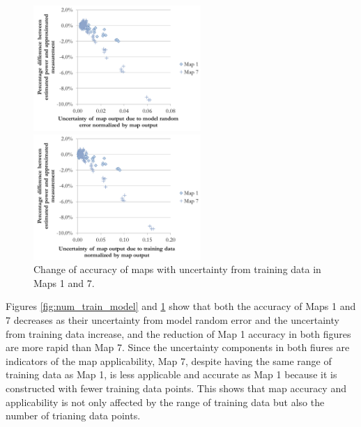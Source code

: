 \begin{figure}[h]
\begin{minipage}{15pc}
\includegraphics[width=15pc]{num_train_model.pdf}
\caption{\label{fig:num_train_model}Change of accuracy of maps with uncertainty from model random error in Maps 1 and 7.}
\end{minipage}\hspace{2pc}%
\begin{minipage}{15pc}
\includegraphics[width=15pc]{num_train_train.pdf}
\caption{\label{fig:num_train_train}Change of accuracy of maps with uncertainty from training data in Maps 1 and 7.}
\end{minipage} 
\end{figure}

Figures \ref{fig:num_train_model} and \ref{fig:num_train_train} show that both the accuracy of Maps 1 and 7 decreases as their uncertainty from model random error and the uncertainty from training data increase, and the reduction of Map 1 accuracy in both figures are more rapid than Map 7. Since the uncertainty components in both fiures are indicators of the map applicability, Map 7, despite having the same range of training data as Map 1, is less applicable and accurate as Map 1 because it is constructed with fewer training data points. This shows that map accuracy and applicability is not only affected by the range of training data but also the number of trianing data points.

